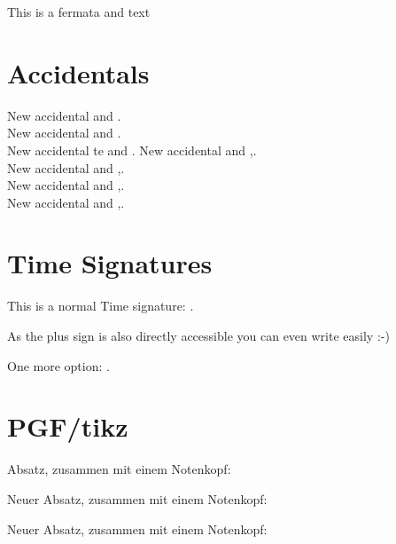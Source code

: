 \documentclass{scrartcl}
\begin{document}
This is a fermata \fermata* and text

\section*{Accidentals}
New \sharp accidental \sharpArrowdown and \sharpArrowdown*.\\
New \sharp accidental \sharpArrowup and \sharpArrowup*.\\
New \sharp accidental te \sharpArrowboth and \sharpArrowboth*.
New accidental \sharpSlashslashStem and \sharpSlashslashStem*,.\\
New accidental \sharpSlashslashslashStemstem and \sharpSlashslashslashStemstem*,.\\
New accidental \sharpSlashslashslashStem and \sharpSlashslashslashStem*,.\\
New accidental \sharpSlashslashStemstemstem and \sharpSlashslashStemstemstem*,.\\

\section*{Time Signatures}
	This is a normal Time signature: .
	
	As the plus sign is also directly accessible you can even
	write  easily :-)
	
	One more option: \lilyText{+}. 
	
\section*{PGF/tikz}

Absatz, zusammen mit einem Notenkopf: 

\Large
Neuer Absatz, zusammen mit einem Notenkopf: 

\normalsize
Neuer Absatz, zusammen mit einem Notenkopf: 
\end{document}
